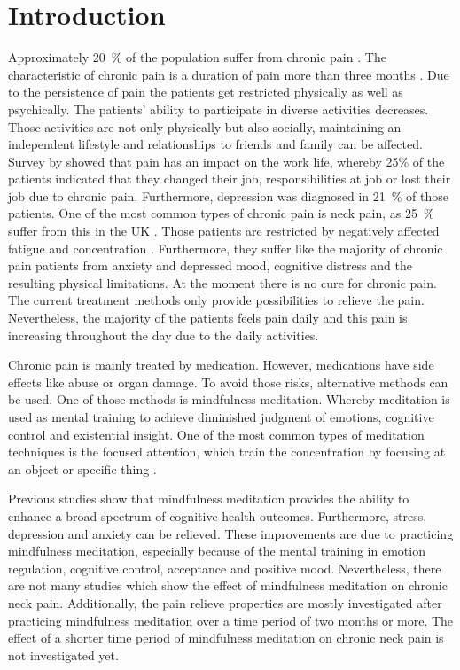 \section{Introduction}
Approximately 20~\% of the population suffer from chronic pain \cite{Macfarlanea2016}. The characteristic of chronic pain is a duration of pain more than three months \cite{Mello2016}. Due to the persistence of pain the patients get restricted physically as well as psychically. The patients’ ability to participate in diverse activities decreases. Those activities are not only physically but also socially, maintaining an independent lifestyle and relationships to friends and family can be affected. Survey by \cite{Breivik2006} showed that pain has an impact on the work life, whereby 25\% of the patients indicated that they changed their job, responsibilities at job or lost their job due to chronic pain. Furthermore, depression was diagnosed in 21~\% of those patients. \cite{Breivik2006} One of the most common types of chronic pain is neck pain, as 25~\% suffer from this in the UK \cite{Macfarlanea2016}. Those patients are restricted by negatively affected fatigue and concentration \cite{vanRanderaat2016}. Furthermore, they suffer like the majority of chronic pain patients from anxiety and depressed mood, cognitive distress and the resulting physical limitations. \cite{Gross2013} At the moment there is no cure for chronic pain. The current treatment methods only provide possibilities to relieve the pain. \cite{Pope2017,marcus2009} Nevertheless, the majority of the patients feels pain daily and this pain is increasing throughout the day due to the daily activities. \cite{Breivik2006} 


Chronic pain is mainly treated by medication. However, medications have side effects like abuse or organ damage. To avoid those risks, alternative methods can be used. One of those methods is mindfulness meditation. Whereby meditation is used as mental training to achieve diminished judgment of emotions, cognitive control and existential insight. \cite{marcus2009} One of the most common types of meditation techniques is the focused attention, which train the concentration by focusing at an object or specific thing \cite{Ziedan2016}. 

Previous studies show that mindfulness meditation provides the ability to enhance a broad spectrum of cognitive health outcomes. Furthermore, stress, depression and anxiety can be relieved. These improvements are due to practicing mindfulness meditation, especially because of the mental training in emotion regulation, cognitive control, acceptance and positive mood. \cite{marcus2009,Zeidan2012}Nevertheless, there are not many studies which show the effect of mindfulness meditation on chronic neck pain. \cite{Macfarlanea2016} Additionally, the pain relieve properties are mostly investigated after practicing mindfulness meditation over a time period of two months or more. The effect of a shorter time period of mindfulness meditation on chronic neck pain is not investigated yet. 


